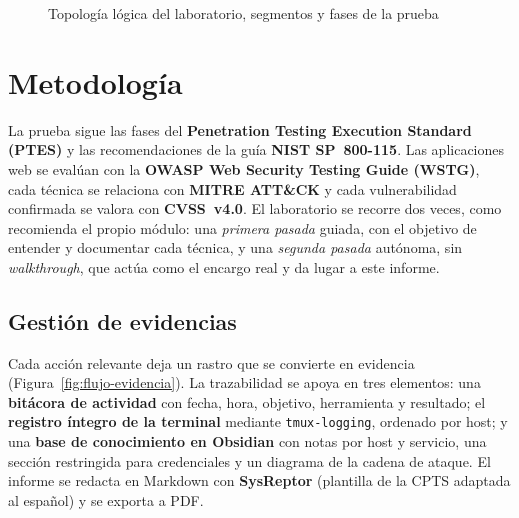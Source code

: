 \documentclass[11pt,a4paper,oneside]{report}
\begin{document}
\begin{figure}[H]
{}
\caption{Topología lógica del laboratorio, segmentos y fases de la prueba}
\label{fig:entorno}
\end{figure}

\section{Metodología}

La prueba sigue las fases del \textbf{Penetration Testing Execution Standard (PTES)} y las recomendaciones de la guía \textbf{NIST SP~800-115}. Las aplicaciones web se evalúan con la \textbf{OWASP Web Security Testing Guide (WSTG)}, cada técnica se relaciona con \textbf{MITRE ATT\&CK} y cada vulnerabilidad confirmada se valora con \textbf{CVSS~v4.0}. El laboratorio se recorre dos veces, como recomienda el propio módulo: una \emph{primera pasada} guiada, con el objetivo de entender y documentar cada técnica, y una \emph{segunda pasada} autónoma, sin \emph{walkthrough}, que actúa como el encargo real y da lugar a este informe.

\subsection{Gestión de evidencias}

Cada acción relevante deja un rastro que se convierte en evidencia (Figura~\ref{fig:flujo-evidencia}). La trazabilidad se apoya en tres elementos: una \textbf{bitácora de actividad} con fecha, hora, objetivo, herramienta y resultado; el \textbf{registro íntegro de la terminal} mediante \texttt{tmux-logging}, ordenado por host; y una \textbf{base de conocimiento en Obsidian} con notas por host y servicio, una sección restringida para credenciales y un diagrama de la cadena de ataque. El informe se redacta en Markdown con \textbf{SysReptor} (plantilla de la CPTS adaptada al español) y se exporta a PDF.
\end{document}
